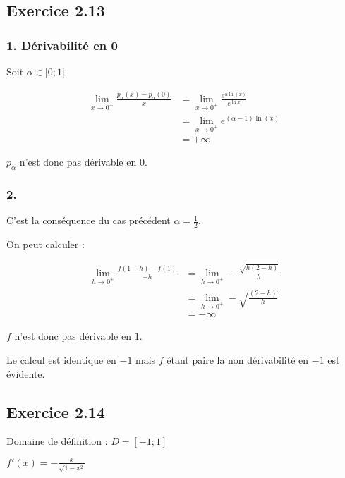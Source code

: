 \documentclass{report}
\begin{document}
\subsection*{Exercice 2.13}
\subsubsection*{1. Dérivabilité en 0}

Soit $\alpha \in ]0;1[$

\begin{equation*}
	\begin{split}
		\lim_{x \rightarrow 0^{+}} \frac{p_{\alpha}(x) - p_{\alpha}(0)}{x}
		&= \lim_{x \rightarrow 0^{+}} \frac{e^{\alpha \ln(x)}}{e^{\ln x}} \\
		&= \lim_{x \rightarrow 0^{+}} e^{(\alpha-1) \ln(x)} \\
		&= +\infty
	\end{split}
\end{equation*}

$p_\alpha$ n'est donc pas dérivable en $0$.

\subsubsection*{2.}

C'est la conséquence du cas précédent $\alpha = \frac{1}{2}$.

On peut calculer :

\begin{equation*}
	\begin{split}
		\lim_{h \rightarrow 0^{+}} \frac{f(1-h) - f(1)}{-h}
			&= \lim_{h \rightarrow 0^{+}} -\frac{\sqrt{h(2-h)}}{h} \\
			&= \lim_{h \rightarrow 0^{+}} -\sqrt{\frac{(2-h)}{h}} \\
			&= -\infty
	\end{split}
\end{equation*}

$f$ n'est donc pas dérivable en $1$.

Le calcul est identique en $-1$ mais $f$ étant paire la non dérivabilité en $-1$ est évidente.


\subsection*{Exercice 2.14}

Domaine de définition : $D = [-1 ; 1]$

$f'(x) = -\frac{x}{\sqrt{1-x^2}}$
\end{document}
